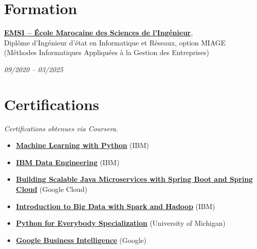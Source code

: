\documentclass[11pt,a4paper,sans]{moderncv}
\begin{document}
  \vspace{-15pt}
  \section{\fontsize{11}{12.1}\selectfont Formation}
  \vspace{-4pt}
\noindent
\parbox[t]{0.78\textwidth}{
    \textbf{\href{https://emsi.ma}{EMSI – École Marocaine des Sciences de l’Ingénieur}}, \\
    Diplôme d’Ingénieur d'état en Informatique et Réseaux, option MIAGE 
    (Méthodes Informatiques Appliquées à la Gestion des Entreprises)
}
\hfill
\parbox[t]{0.2\textwidth}{
    \raggedleft \textit{09/2020 – 03/2025}
}
\vspace{0.3em}



{}

  \vspace{-15pt}
  \section{\fontsize{11}{12.1}\selectfont Certifications}
  \vspace{-5pt}
  \textit{Certifications obtenues via Coursera.}
  \begin{itemize}[leftmargin=0cm, itemsep=-2pt, topsep=0pt, partopsep=0pt, parsep=0pt, label={}]
      \item \textbf{\href{https://www.coursera.org/account/accomplishments/verify/G178XXP17WQA}{Machine Learning with Python}} (IBM)
      \item \textbf{\href{https://www.coursera.org/account/accomplishments/records/M5RKGX36BAVA}{IBM Data Engineering}} (IBM)
      \item \textbf{\href{https://google.com}{Building Scalable Java Microservices with Spring Boot and Spring Cloud}} (Google Cloud)
      \item \textbf{\href{https://www.coursera.org/account/accomplishments/verify/EK5SJM3YM7PX}{Introduction to Big Data with Spark and Hadoop}} (IBM)
      \item \textbf{\href{https://www.coursera.org/account/accomplishments/specialization/B4RCUAYCUG49}{Python for Everybody Specialization}} (University of Michigan)
      \item \textbf{\href{https://www.coursera.org/account/accomplishments/records/G867SJLRFQS2}{Google Business Intelligence}} (Google)
  \end{itemize}
\end{document}
